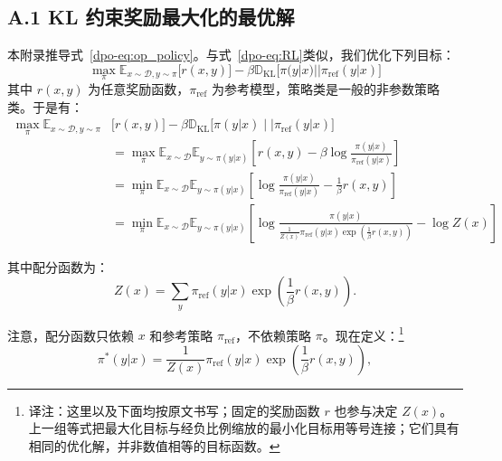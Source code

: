 \subsection*{A.1 KL 约束奖励最大化的最优解}
本附录推导式~\ref{dpo-eq:op_policy}。与式~\ref{dpo-eq:RL}类似，我们优化下列目标：
\begin{equation}\label{dpo-display-12}
\max_{\pi}  \mathbb{E}_{x\sim \mathcal{D}, y\sim \pi}\bigl[r(x, y)\bigr] - \beta\mathbb{D}_{\textrm{KL}}\bigl[\pi(y|x)||\pi_{\mathrm{ref}}(y|x)\bigr]
\end{equation}
其中 $r(x,y)$ 为任意奖励函数，$\pi_{\mathrm{ref}}$ 为参考模型，策略类是一般的非参数策略类。于是有：
\begin{align}\label{dpo-eq:RL_proof}
\max_{\pi}  \mathbb{E}_{x\sim \mathcal{D}, y\sim \pi}&\bigl[r(x, y)\bigr] - \beta\mathbb{D}_{\textrm{KL}}\bigl[\pi(y|x)\mid\mid\pi_{\mathrm{ref}}(y|x)\bigr] \nonumber\\
&=\max_{\pi}  \mathbb{E}_{x\sim \mathcal{D}}\mathbb{E}_{y\sim \pi(y|x)}\left[r(x, y) - \beta\log\frac{\pi(y|x)}{\pi_{\mathrm{ref}}(y|x)}\right] \nonumber\\&=
\min_{\pi}  \mathbb{E}_{x\sim \mathcal{D}}\mathbb{E}_{y\sim \pi(y|x)}\left[\log\frac{\pi(y|x)}{\pi_{\mathrm{ref}}(y|x)} - \frac{1}{\beta}r(x, y)\right] \nonumber\\ &=
\min_{\pi}  \mathbb{E}_{x\sim \mathcal{D}}\mathbb{E}_{y\sim \pi(y|x)}\left[\log\frac{\pi(y|x)}{\frac{1}{Z(x)}\pi_{\mathrm{ref}}(y|x)\exp\left(\frac{1}{\beta}r(x, y)\right)} - \log Z(x)\right]
\end{align}

其中配分函数为：
\label{dpo-display-14}
\begin{equation*}
Z(x) = \sum_{y}\pi_{\mathrm{ref}}(y|x)\exp\left(\frac{1}{\beta}r(x, y)\right).
\end{equation*}

注意，配分函数只依赖 $x$ 和参考策略 $\pi_{\mathrm{ref}}$，不依赖策略 $\pi$。现在定义：\footnote{译注：这里以及下面均按原文书写；固定的奖励函数 $r$ 也参与决定 $Z(x)$。上一组等式把最大化目标与经负比例缩放的最小化目标用等号连接；它们具有相同的优化解，并非数值相等的目标函数。}
\label{dpo-display-15}
\begin{equation*}
    \pi^*(y|x) = \frac{1}{Z(x)}\pi_{\mathrm{ref}}(y|x)\exp\left(\frac{1}{\beta}r(x, y)\right),
\end{equation*}

